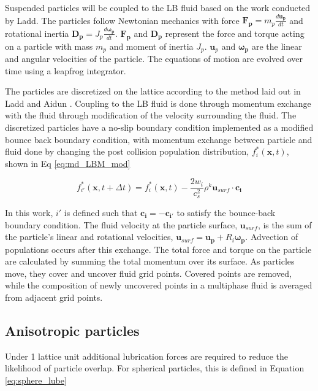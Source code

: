 Suspended particles will be coupled to the LB fluid based on the work conducted by Ladd. \cite{ladd_numerical_1994, aidun_direct_1998, ladd_lattice-boltzmann_2001} The particles follow Newtonian mechanics with force $\mathbf{F_p} = m_p\frac{d \mathbf{u_p} }{dt}$ and rotational inertia $\mathbf{D_p} = J_p \frac{d \mathbf{\omega_{p}}}{dt}$. $\mathbf{F_p}$ and $\mathbf{D_p}$ represent the force and torque acting on a particle with mass $m_p$ and moment of inertia $J_p$. $\mathbf{u}_p$ and $\mathbf{\omega_{p}}$ are the linear and angular velocities of the particle. The equations of motion are evolved over time using a leapfrog integrator. \cite{jansen_bijels_2011}

The particles are discretized on the lattice according to the method laid out in Ladd and Aidun \cite{ladd_lattice-boltzmann_2001}. Coupling to the LB fluid is done through momentum exchange with the fluid through modification of the velocity surrounding the fluid. The discretized particles have a no-slip boundary condition implemented as a modified bounce back boundary condition, with momentum exchange between particle and fluid done by changing the post collision population distribution, $f^{*}_{i}(\mathbf{x}, t)$, shown in Eq \ref{eq:md_LBM_mod}

\begin{equation}
    f^{*}_{i'}(\mathbf{x}, t + \Delta t) = f^{*}_{i}(\mathbf{x}, t) - \frac{2 w_{i}}{c_s^2}\rho^k \mathbf{u}_{surf} \cdot \mathbf{c_i}
    \label{eq:md_LBM_mod}
\end{equation}

In this work, $i'$ is defined such that $\mathbf{c_i} = -\mathbf{c_{i'}}$ to satisfy the bounce-back boundary condition. The fluid velocity at the particle surface, $\mathbf{u}_{surf}$, is the sum of the particle's linear and rotational velocities, $\mathbf{u}_{surf} = \mathbf{u_p} + R_i\mathbf{\omega_p}$. Advection of populations occurs after this exchange. The total force and torque on the particle are calculated by summing the total momentum over its surface. As particles move, they cover and uncover fluid grid points. Covered points are removed, while the composition of newly uncovered points in a multiphase fluid is averaged from adjacent grid points. 

\subsection{Anisotropic particles}

Under 1 lattice unit additional lubrication forces are required to reduce the likelihood of particle overlap. For spherical particles, this is defined in Equation \ref{eq:sphere_lube}

